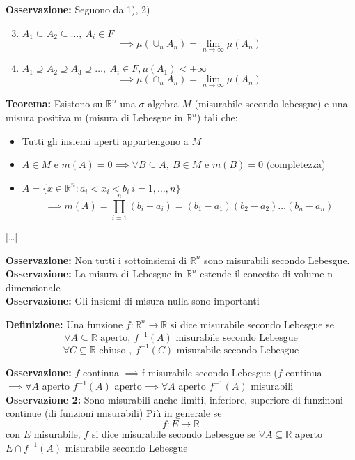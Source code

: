 \documentclass[a4paper]{article}
\newcommand{\R}{\mathbb{R}}
\begin{document}
\textbf{Osservazione:} Seguono da 1), 2)
\begin{enumerate}
\setcounter{enumi}{2}
	\item $A_1\subseteq A_2\subseteq \ldots,\ A_i\in F$\[\implies \mu(\cup_n A_n)=\lim_{n \to \infty} \mu(A_n)\]
	\item $A_1 \supseteq A_2\supseteq A_3\supseteq \ldots, \ A_i\in F,\mu (A_1)<+\infty$\[\implies\mu( \cap_n A_n)=\lim_{n \to \infty}\mu(A_n)\] 
\end{enumerate}
\begin{tcolorbox}
	\textbf{Teorema:} Esistono su $\R^n$ una $\sigma$-algebra $M$ (misurabile secondo lebesgue) e una misura positiva m (misura di Lebesgue in $\R^n$) tali che:
	\begin{itemize}
		\item Tutti gli insiemi aperti appartengono a $M$
		\item $A\in M$ e $m(A)=0\implies\forall B\subseteq A,\ B\in M \text{ e } m(B)=0$ (completezza)
		\item $A=\{x\in \R^n: a_i<x_i<b_i\ i=1,\ldots,n\}$\[\implies m(A)=\prod_{i=1}^n(b_i-a_i)=(b_1-a_1)(b_2-a_2)\ldots(b_n-a_n)\]
	\end{itemize}
	[\ldots] 
\end{tcolorbox}
\textbf{Osservazione: }Non tutti i sottoinsiemi di $\R^n$ sono misurabili secondo Lebesgue.
\\\textbf{Osservazione: }La misura di Lebesgue in $\R^n$ estende il concetto di volume n-dimensionale
\\\textbf{Osservazione:} Gli insiemi di misura nulla sono importanti 
\begin{tcolorbox}
	\textbf{Definizione:} Una funzione $f:\R^n\to \R$ si dice misurabile secondo Lebesgue se
	\[\forall A\subseteq \R \text{ aperto},\ f^{-1}(A) \text{ misurabile secondo Lebesgue}\]
	\[\forall C\subseteq\R\text{ chiuso }, \ f^{-1}(C)\text{ misurabile secondo Lebesgue}\]
\end{tcolorbox}
\textbf{Osservazione:} $f$ continua $\implies$f misurabile secondo Lebesgue ($f$ continua $\implies\forall A$ aperto $f^{-1}(A)$ aperto$\implies \forall  A$ aperto $f^{-1}(A)$ misurabili
\\\textbf{Osservazione 2:} Sono misurabili anche limiti, inferiore, superiore di funzinoni continue (di funzioni misurabili)\bigbreak
Più in generale se 
\[f: E\to \R\] con $E$ misurabile, $f$ si dice misurabile secondo Lebesgue se $\forall  A\subseteq\R$ aperto $E\cap f^{-1}(A)$ misurabile secondo Lebesgue
\end{document}
